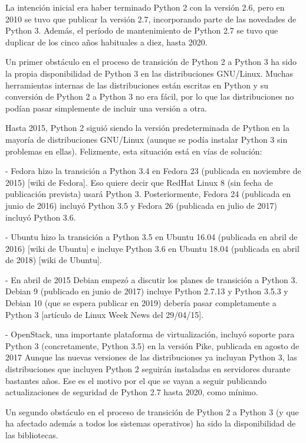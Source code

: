 La intención inicial era haber terminado Python 2 con la versión 2.6, pero en 2010 se tuvo que publicar la versión 2.7, incorporando parte de las novedades de Python 3. Además, el período de mantenimiento de Python 2.7 se tuvo que duplicar de los cinco años habituales a diez, hasta 2020.

Un primer obstáculo en el proceso de transición de Python 2 a Python 3 ha sido la propia disponibilidad de Python 3 en las distribuciones GNU/Linux. Muchas herramientas internas de las distribuciones están escritas en Python y su conversión de Python 2 a Python 3 no era fácil, por lo que las distribuciones no podían pasar simplemente de incluir una versión a otra.

Hasta 2015, Python 2 siguió siendo la versión predeterminada de Python en la mayoría de distribuciones GNU/Linux (aunque se podía instalar Python 3 sin problemas en ellas). Felizmente, esta situación está en vías de solución:

- Fedora hizo la transición a Python 3.4 en Fedora 23 (publicada en noviembre de 2015) [wiki de Fedora]. Eso quiere decir que RedHat Linux 8 (sin fecha de publicación prevista) usará Python 3. Posteriormente, Fedora 24 (publicada en junio de 2016) incluyó Python 3.5 y Fedora 26 (publicada en julio de 2017) incluyó Python 3.6.

- Ubuntu hizo la transición a Python 3.5 en Ubuntu 16.04 (publicada en abril de 2016) [wiki de Ubuntu] e incluye Python 3.6 en Ubuntu 18.04 (publicada en abril de 2018) [wiki de Ubuntu].

- En abril de 2015 Debian empezó a discutir los planes de transición a Python 3. Debian 9 (publicado en junio de 2017) incluye Python 2.7.13 y Python 3.5.3 y Debian 10 (que se espera publicar en 2019) debería pasar completamente a Python 3 [artículo de Linux Week News del 29/04/15].

- OpenStack, una importante plataforma de virtualización, incluyó soporte para Python 3 (concretamente, Python 3.5) en la versión Pike, publicada en agosto de 2017
Aunque las nuevas versiones de las distribuciones ya incluyan Python 3, las distribuciones que incluyen Python 2 seguirán instaladas en servidores durante bastantes años. Ese es el motivo por el que se vayan a seguir publicando actualizaciones de seguridad de Python 2.7 hasta 2020, como mínimo.

Un segundo obstáculo en el proceso de transición de Python 2 a Python 3 (y que ha afectado además a todos los sistemas operativos) ha sido la disponibilidad de las bibliotecas.

